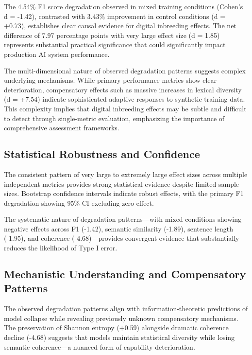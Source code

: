 \documentclass[11pt]{article}
\begin{document}
The 4.54\% F1 score degradation observed in mixed training conditions (Cohen's d = -1.42), contrasted with 3.43\% improvement in control conditions (d = +0.73), establishes clear causal evidence for digital inbreeding effects. The net difference of 7.97 percentage points with very large effect size (d = 1.85) represents substantial practical significance that could significantly impact production AI system performance.

The multi-dimensional nature of observed degradation patterns suggests complex underlying mechanisms. While primary performance metrics show clear deterioration, compensatory effects such as massive increases in lexical diversity (d = +7.54) indicate sophisticated adaptive responses to synthetic training data. This complexity implies that digital inbreeding effects may be subtle and difficult to detect through single-metric evaluation, emphasizing the importance of comprehensive assessment frameworks.

\subsection{Statistical Robustness and Confidence}

The consistent pattern of very large to extremely large effect sizes across multiple independent metrics provides strong statistical evidence despite limited sample sizes. Bootstrap confidence intervals indicate robust effects, with the primary F1 degradation showing 95\% CI excluding zero effect.

The systematic nature of degradation patterns—with mixed conditions showing negative effects across F1 (-1.42), semantic similarity (-1.89), sentence length (-1.95), and coherence (-4.68)—provides convergent evidence that substantially reduces the likelihood of Type I error.

\subsection{Mechanistic Understanding and Compensatory Patterns}

The observed degradation patterns align with information-theoretic predictions of model collapse while revealing previously unknown compensatory mechanisms. The preservation of Shannon entropy (+0.59) alongside dramatic coherence decline (-4.68) suggests that models maintain statistical diversity while losing semantic coherence—a nuanced form of capability deterioration.
\end{document}
